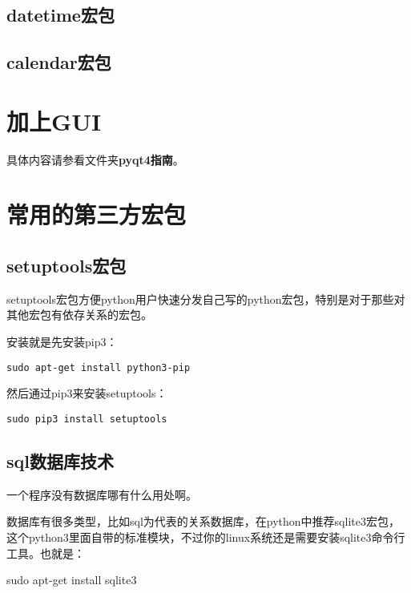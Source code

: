 \documentclass[12pt,oneside]{book}
\begin{document}
\begin{common-format}
\chapter{datetime宏包}

\chapter{calendar宏包}



\part{加上GUI}
具体内容请参看文件夹\textbf{pyqt4指南}。




\part{常用的第三方宏包}
\chapter{setuptools宏包}
setuptools宏包方便python用户快速分发自己写的python宏包，特别是对于那些对其他宏包有依存关系的宏包。

安装就是先安装pip3：
\begin{Verbatim}
sudo apt-get install python3-pip
\end{Verbatim}


然后通过pip3来安装setuptools：
\begin{Verbatim}
sudo pip3 install setuptools
\end{Verbatim}


\chapter{sql数据库技术}
\begin{flushright}
\begin{notecard}[red!30]{12em}
 一个程序没有数据库哪有什么用处啊。
\end{notecard}
\end{flushright}


数据库有很多类型，比如sql为代表的关系数据库，在python中推荐sqlite3宏包，这个python3里面自带的标准模块，不过你的linux系统还是需要安装sqlite3命令行工具。也就是：

\begin{tcbbash}[]
sudo apt-get install sqlite3
\end{tcbbash}





\end{common-format}
\end{document}
